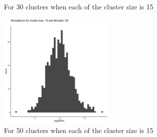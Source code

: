 \documentclass[
  letterpaper,
  DIV=11,
  numbers=noendperiod]{scrartcl}
\begin{document}
\begin{figure}
\begin{minipage}[t]{0.11\linewidth}
{\centering 

~

}

\end{minipage}%
%
\begin{minipage}[t]{0.44\linewidth}

{\centering 


\caption{For 30 clusters when each of the cluster size is 15}

}

\end{minipage}%

\end{figure}

\vspace{5mm}

\begin{figure}[H]

{\centering \includegraphics[width=0.5\textwidth,height=\textheight]{../plots/hist_50_15.png}

}

\caption{For 50 clusters when each of the cluster size is 15}

\end{figure}
\end{document}

